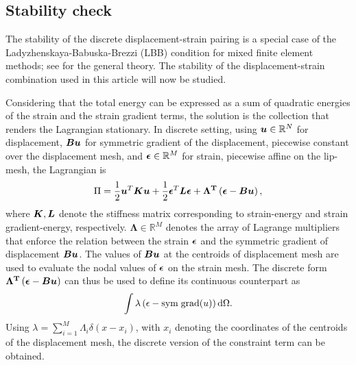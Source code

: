 \documentclass[10pt]{cas-sc}
\newenvironment{addedblock}
{\begingroup\color{blue!80}}
{\endgroup}
\begin{document}
\begin{addedblock}
	\subsection{Stability check \label{stab_check_lip_disp}}
	The stability of the discrete displacement-strain pairing is a special case of the Ladyzhenskaya-Babuska-Brezzi (LBB) condition for mixed finite element methods; see \cite{auricchio2017mixed} for the general theory. The stability of the displacement-strain combination used in this article will now be studied.
	
	Considering that the total energy can be expressed as a sum of quadratic energies of the strain and the strain gradient terms, the solution is the collection that renders the Lagrangian stationary. In discrete setting, using $\mbox{\boldmath $u$} \in \mathbb{R} ^N$ for displacement, $\mbox{\boldmath $B$} \mbox{\boldmath $u$}$ for symmetric gradient of the displacement, piecewise constant over the displacement mesh, and $\mbox{\boldmath $\epsilon$} \in \mathbb{R}^M$ for strain, piecewise affine on the lip-mesh, the Lagrangian is
	\begin{equation}
		\Pi = \frac{1}{2} \mbox{\boldmath $u$} ^T \mbox{\boldmath $K$} \mbox{\boldmath $u$} + \frac{1}{2} \mbox{\boldmath $\epsilon$} ^T \mbox{\boldmath $L$} \mbox{\boldmath $\epsilon$} + \bf \Lambda ^T \left(\mbox{\boldmath $\epsilon$} - \mbox{\boldmath $B$} \mbox{\boldmath $u$} \right),
	\end{equation}
	where $\mbox{\boldmath $K$},\mbox{\boldmath $L$} $ denote the stiffness matrix corresponding to strain-energy and strain gradient-energy, respectively. $\mathbf{\Lambda} \in \mathbb{R}^M$ denotes the array of Lagrange multipliers that enforce the relation between the strain $\mbox{\boldmath $\epsilon$}$ and the symmetric gradient of displacement $\mbox{\boldmath $B$} \mbox{\boldmath $u$}$. The values of $\mbox{\boldmath $B$} \mbox{\boldmath $u$}$ at the centroids of displacement mesh are used to evaluate the nodal values of $\mbox{\boldmath $\epsilon$} $ on the strain mesh. The discrete form $\bf \Lambda ^T \left(\mbox{\boldmath $\epsilon$} - \mbox{\boldmath $B$} \mbox{\boldmath $u$} \right)$ can thus be used to define its continuous counterpart as
	\begin{equation}
		\int \lambda \left( {\epsilon} - {\rm sym \; grad}(u) \right) \mathop{}\!\mathrm{d} \Omega.
	\end{equation}
	Using $\lambda = \sum_{i=1}^{M} \Lambda_i \delta (x-x_i) $, with $x_i$ denoting the coordinates of the centroids of the displacement mesh, the discrete version of the constraint term can be obtained.
	

\end{addedblock}
\end{document}
